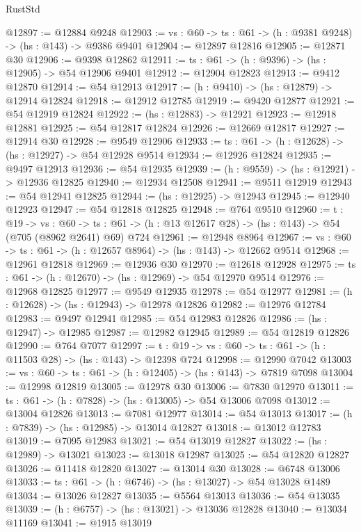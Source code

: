 \begin{lexlean}{RustStd}
\begin{coremodule}
@12897 := @12884 @9248
@12903 := {vs : @60} -> {ts : @61} -> (h : @9381 @9248) -> (hs : @143) -> @9386 @9401
@12904 := @12897 @12816
@12905 := @12871 @30
@12906 := @9398 @12862
@12911 := {ts : @61} -> (h : @9396) -> (hs : @12905) -> @54 @12906 @9401
@12912 := @12904 @12823
@12913 := @9412 @12870
@12914 := @54 @12913
@12917 := (h : @9410) -> (hs : @12879) -> @12914 @12824
@12918 := @12912 @12785
@12919 := @9420 @12877
@12921 := @54 @12919 @12824
@12922 := (hs : @12883) -> @12921
@12923 := @12918 @12881
@12925 := @54 @12817 @12824
@12926 := @12669 @12817
@12927 := @12914 @30
@12928 := @9549 @12906
@12933 := {ts : @61} -> (h : @12628) -> (hs : @12927) -> @54 @12928 @9514
@12934 := @12926 @12824
@12935 := @9497 @12913
@12936 := @54 @12935
@12939 := (h : @9559) -> (hs : @12921) -> @12936 @12825
@12940 := @12934 @12508
@12941 := @9511 @12919
@12943 := @54 @12941 @12825
@12944 := (hs : @12925) -> @12943
@12945 := @12940 @12923
@12947 := @54 @12818 @12825
@12948 := @764 @9510
@12960 := {t : @19} ->
  {vs : @60} ->
  {ts : @61} -> (h : @13 @12617 @28) -> (hs : @143) -> @54 (@705 (@8962 @2641) @69) @724
@12961 := @12948 @8964
@12967 := {vs : @60} -> {ts : @61} -> (h : @12657 @8964) -> (hs : @143) -> @12662 @9514
@12968 := @12961 @12818
@12969 := @12936 @30
@12970 := @12618 @12928
@12975 := {ts : @61} -> (h : @12670) -> (hs : @12969) -> @54 @12970 @9514
@12976 := @12968 @12825
@12977 := @9549 @12935
@12978 := @54 @12977
@12981 := (h : @12628) -> (hs : @12943) -> @12978 @12826
@12982 := @12976 @12784
@12983 := @9497 @12941
@12985 := @54 @12983 @12826
@12986 := (hs : @12947) -> @12985
@12987 := @12982 @12945
@12989 := @54 @12819 @12826
@12990 := @764 @7077
@12997 := {t : @19} -> {vs : @60} -> {ts : @61} -> (h : @11503 @28) -> (hs : @143) -> @12398 @724
@12998 := @12990 @7042
@13003 := {vs : @60} -> {ts : @61} -> (h : @12405) -> (hs : @143) -> @7819 @7098
@13004 := @12998 @12819
@13005 := @12978 @30
@13006 := @7830 @12970
@13011 := {ts : @61} -> (h : @7828) -> (hs : @13005) -> @54 @13006 @7098
@13012 := @13004 @12826
@13013 := @7081 @12977
@13014 := @54 @13013
@13017 := (h : @7839) -> (hs : @12985) -> @13014 @12827
@13018 := @13012 @12783
@13019 := @7095 @12983
@13021 := @54 @13019 @12827
@13022 := (hs : @12989) -> @13021
@13023 := @13018 @12987
@13025 := @54 @12820 @12827
@13026 := @11418 @12820
@13027 := @13014 @30
@13028 := @6748 @13006
@13033 := {ts : @61} -> (h : @6746) -> (hs : @13027) -> @54 @13028 @1489
@13034 := @13026 @12827
@13035 := @5564 @13013
@13036 := @54 @13035
@13039 := (h : @6757) -> (hs : @13021) -> @13036 @12828
@13040 := @13034 @11169
@13041 := @1915 @13019

\end{coremodule}
\end{lexlean}
